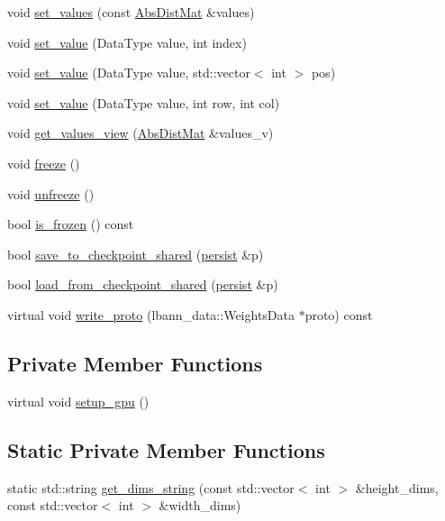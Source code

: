 \begin{DoxyCompactItemize}
\item 
void \hyperlink{classlbann_1_1weights_ae10da5d92c9402ced7e55f04fbd05a2e}{set\+\_\+values} (const \hyperlink{base_8hpp_a9a697a504ae84010e7439ffec862b470}{Abs\+Dist\+Mat} \&values)
\item 
void \hyperlink{classlbann_1_1weights_aaae37ad2df0808eb606609cd58cd223b}{set\+\_\+value} (Data\+Type value, int index)
\item 
void \hyperlink{classlbann_1_1weights_aca05fb7e298c8f9f1f30fa1a8eac9fbf}{set\+\_\+value} (Data\+Type value, std\+::vector$<$ int $>$ pos)
\item 
void \hyperlink{classlbann_1_1weights_a7ac0a9e53b249f16d5e2978e47bd6b7f}{set\+\_\+value} (Data\+Type value, int row, int col)
\item 
void \hyperlink{classlbann_1_1weights_a506b6445c46a92cdadad75caf1c166d3}{get\+\_\+values\+\_\+view} (\hyperlink{base_8hpp_a9a697a504ae84010e7439ffec862b470}{Abs\+Dist\+Mat} \&values\+\_\+v)
\item 
void \hyperlink{classlbann_1_1weights_ab9fe32e21ae25f6b000497addb46351f}{freeze} ()
\item 
void \hyperlink{classlbann_1_1weights_ab1e71f962a7702d0aa023fedf1c99e98}{unfreeze} ()
\item 
bool \hyperlink{classlbann_1_1weights_a5874876052191837679634186c64c388}{is\+\_\+frozen} () const
\item 
bool \hyperlink{classlbann_1_1weights_a48dd6b3d37668bf2ab5abafdf9dabde4}{save\+\_\+to\+\_\+checkpoint\+\_\+shared} (\hyperlink{classlbann_1_1persist}{persist} \&p)
\item 
bool \hyperlink{classlbann_1_1weights_ad41cac4b516d83f086cdfbcdfaa8223c}{load\+\_\+from\+\_\+checkpoint\+\_\+shared} (\hyperlink{classlbann_1_1persist}{persist} \&p)
\item 
virtual void \hyperlink{classlbann_1_1weights_a1a2631987f38d32a90fbee61053a04cc}{write\+\_\+proto} (lbann\+\_\+data\+::\+Weights\+Data $\ast$proto) const
\end{DoxyCompactItemize}
\subsection*{Private Member Functions}
\begin{DoxyCompactItemize}
\item 
virtual void \hyperlink{classlbann_1_1weights_a7137725a835a37ded1a5ad7f739224a7}{setup\+\_\+gpu} ()
\end{DoxyCompactItemize}
\subsection*{Static Private Member Functions}
\begin{DoxyCompactItemize}
\item 
static std\+::string \hyperlink{classlbann_1_1weights_ac15d39b1d887c8ff927b0c29f667e752}{get\+\_\+dims\+\_\+string} (const std\+::vector$<$ int $>$ \&height\+\_\+dims, const std\+::vector$<$ int $>$ \&width\+\_\+dims)
\end{DoxyCompactItemize}
